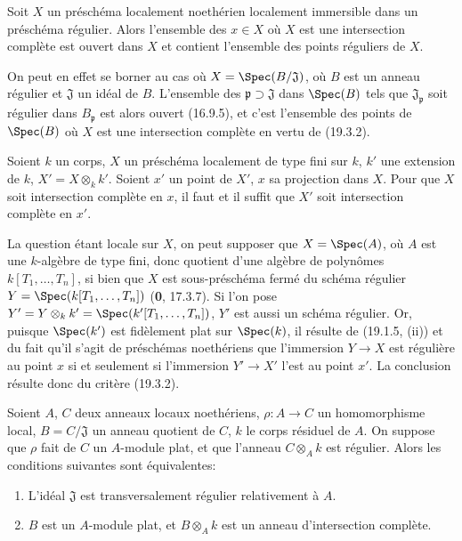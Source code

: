 \begin{corollary}[19.3.3]
\label{IV.19.3.3}
Soit $X$ un préschéma localement noethérien localement immersible dans un préschéma régulier. Alors l'ensemble des $x\in X$ où $X$ est une intersection complète est ouvert dans $X$ et contient l'ensemble des points réguliers de $X$.
\end{corollary}

On peut en effet se borner au cas où $X=\Spec(B/\mathfrak J)$, où $B$ est un anneau régulier et $\mathfrak J$ un idéal de $B$. L'ensemble des $\mathfrak p\supset\mathfrak J$ dans $\Spec(B)$ tels que $\mathfrak J_{\mathfrak p}$ soit régulier dans $B_{\mathfrak p}$ est alors ouvert (16.9.5), et c'est l'ensemble des points de $\Spec(B)$ où $X$ est une intersection complète en vertu de (19.3.2).

\begin{corollary}[19.3.4]
\label{IV.19.3.4}
Soient $k$ un corps, $X$ un préschéma localement de type fini sur $k$, $k'$ une extension de $k$, $X'=X\otimes_k k'$. Soient $x'$ un point de $X'$, $x$ sa projection dans $X$. Pour que $X$ soit intersection complète en $x$, il faut et il suffit que $X'$ soit intersection complète en $x'$.
\end{corollary}

La question étant locale sur $X$, on peut supposer que $X=\Spec(A)$, où $A$ est une $k$-algèbre de type fini, donc quotient d'une algèbre de polynômes $k[T_1,\ldots,T_n]$, si bien que $X$ est sous-préschéma fermé du schéma régulier $Y=\Spec(k[T_1,\ldots,T_n])$ (\textbf{0}, 17.3.7). Si l'on pose $Y'=Y\otimes_k k'=\Spec(k'[T_1,\ldots,T_n])$, $Y'$ est aussi un schéma régulier. Or, puisque $\Spec(k')$ est fidèlement plat sur $\Spec(k)$, il résulte de (19.1.5, (ii)) et du fait qu'il s'agit de préschémas noethériens que l'immersion $Y\to X$ est régulière au point $x$ si et seulement si l'immersion $Y'\to X'$ l'est au point $x'$. La conclusion résulte donc du critère (19.3.2).

\begin{corollary}[19.3.5]
\label{IV.19.3.5}
Soient $A$, $C$ deux anneaux locaux noethériens, $\rho:A\to C$ un homomorphisme local, $B=C/\mathfrak J$ un anneau quotient de $C$, $k$ le corps résiduel de $A$. On suppose que $\rho$ fait de $C$ un $A$-module plat, et que l'anneau $C\otimes_A k$ est régulier. Alors les conditions suivantes sont équivalentes:
\begin{enumerate}
  \item[\textup{a)}] L'idéal $\mathfrak J$ est transversalement régulier relativement à $A$.
  \item[\textup{b)}] $B$ est un $A$-module plat, et $B\otimes_A k$ est un anneau d'intersection complète.
\end{enumerate}
\end{corollary}

